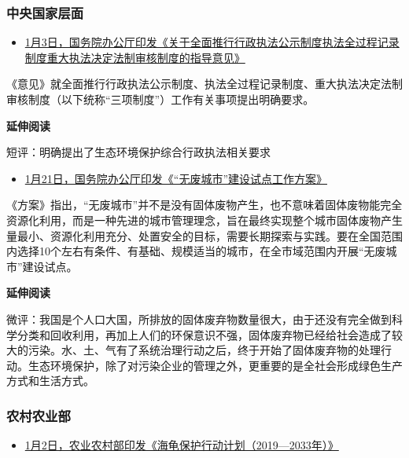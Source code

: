 \documentclass[
]{book}
\providecommand{\tightlist}{%
  \setlength{\itemsep}{0pt}\setlength{\parskip}{0pt}}
\begin{document}
\hypertarget{ux4e2dux592eux56fdux5bb6ux5c42ux9762-2}{%
\subsubsection*{中央国家层面}\label{ux4e2dux592eux56fdux5bb6ux5c42ux9762-2}}

\begin{itemize}
\tightlist
\item
  \href{http://www.gov.cn/xinwen/2019-01/03/content_5354578.htm}{1月3日，国务院办公厅印发《关于全面推行行政执法公示制度执法全过程记录制度重大执法决定法制审核制度的指导意见》}
\end{itemize}

《意见》就全面推行行政执法公示制度、执法全过程记录制度、重大执法决定法制审核制度（以下统称``三项制度''）工作有关事项提出明确要求。

\textbf{延伸阅读}

短评：明确提出了生态环境保护综合行政执法相关要求

\begin{itemize}
\tightlist
\item
  \href{http://www.gov.cn/zhengce/content/2019-01/21/content_5359620.htm}{1月21日，国务院办公厅印发《``无废城市''建设试点工作方案》}
\end{itemize}

《方案》指出，``无废城市''并不是没有固体废物产生，也不意味着固体废物能完全资源化利用，而是一种先进的城市管理理念，旨在最终实现整个城市固体废物产生量最小、资源化利用充分、处置安全的目标，需要长期探索与实践。要在全国范围内选择10个左右有条件、有基础、规模适当的城市，在全市域范围内开展``无废城市''建设试点。

\textbf{延伸阅读}

微评：我国是个人口大国，所排放的固体废弃物数量很大，由于还没有完全做到科学分类和回收利用，再加上人们的环保意识不强，固体废弃物已经给社会造成了较大的污染。水、土、气有了系统治理行动之后，终于开始了固体废弃物的处理行动。生态环境保护，除了对污染企业的管理之外，更重要的是全社会形成绿色生产方式和生活方式。

\hypertarget{ux519cux6751ux519cux4e1aux90e8}{%
\subsubsection*{农村农业部}\label{ux519cux6751ux519cux4e1aux90e8}}

\begin{itemize}
\tightlist
\item
  \href{http://env.people.com.cn/n1/2018/1211/c1010-30460351.html}{1月2日，农业农村部印发《海龟保护行动计划（2019---2033年）》}
\end{itemize}
\end{document}

